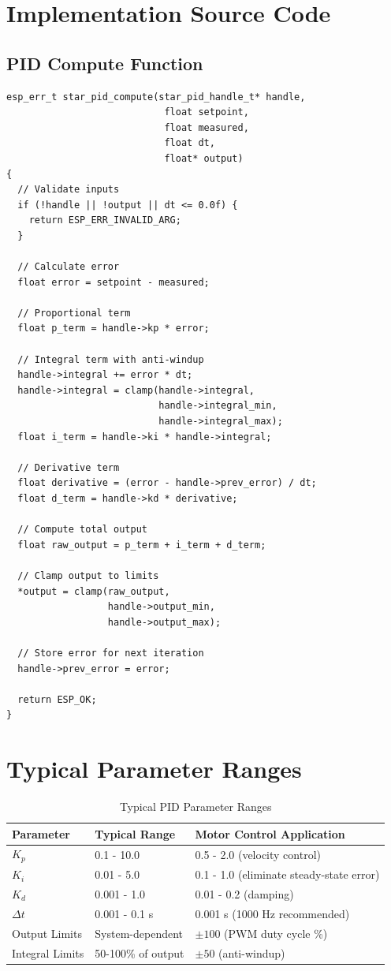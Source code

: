 \documentclass[11pt,a4paper]{article}
\begin{document}
\appendix

\section{Implementation Source Code}

\subsection{PID Compute Function}

\begin{lstlisting}
esp_err_t star_pid_compute(star_pid_handle_t* handle,
                            float setpoint,
                            float measured,
                            float dt,
                            float* output)
{
  // Validate inputs
  if (!handle || !output || dt <= 0.0f) {
    return ESP_ERR_INVALID_ARG;
  }

  // Calculate error
  float error = setpoint - measured;

  // Proportional term
  float p_term = handle->kp * error;

  // Integral term with anti-windup
  handle->integral += error * dt;
  handle->integral = clamp(handle->integral,
                           handle->integral_min,
                           handle->integral_max);
  float i_term = handle->ki * handle->integral;

  // Derivative term
  float derivative = (error - handle->prev_error) / dt;
  float d_term = handle->kd * derivative;

  // Compute total output
  float raw_output = p_term + i_term + d_term;

  // Clamp output to limits
  *output = clamp(raw_output,
                  handle->output_min,
                  handle->output_max);

  // Store error for next iteration
  handle->prev_error = error;

  return ESP_OK;
}
\end{lstlisting}

\section{Typical Parameter Ranges}

\begin{table}[h]
\centering
\begin{tabular}{lll}
\toprule
\textbf{Parameter} & \textbf{Typical Range} & \textbf{Motor Control Application} \\
\midrule
$K_p$ & 0.1 - 10.0 & 0.5 - 2.0 (velocity control) \\
$K_i$ & 0.01 - 5.0 & 0.1 - 1.0 (eliminate steady-state error) \\
$K_d$ & 0.001 - 1.0 & 0.01 - 0.2 (damping) \\
$\Delta t$ & 0.001 - 0.1 s & 0.001 s (1000 Hz recommended) \\
Output Limits & System-dependent & $\pm 100$ (PWM duty cycle \%) \\
Integral Limits & 50-100\% of output & $\pm 50$ (anti-windup) \\
\bottomrule
\end{tabular}
\caption{Typical PID Parameter Ranges}
\end{table}
\end{document}
